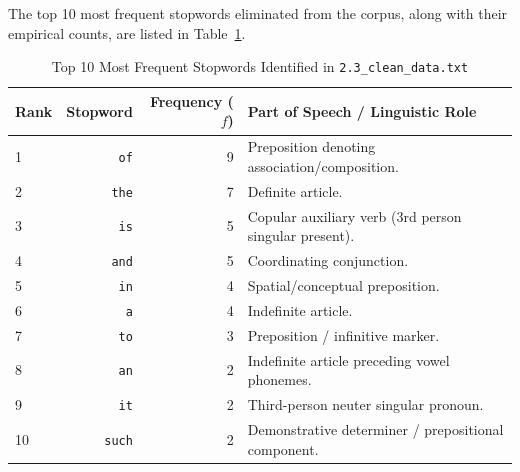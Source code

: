 \documentclass[12pt,a4paper]{report}
\begin{document}
The top 10 most frequent stopwords eliminated from the corpus, along with their empirical counts, are listed in Table~\ref{tab:exp2_top_stopwords}.
\begin{table}[H]
\centering
\small
\caption{Top 10 Most Frequent Stopwords Identified in \texttt{2.3\_clean\_data.txt}}
\label{tab:exp2_top_stopwords}
\begin{tabular}{lrrp{6.5cm}}
\toprule
\textbf{Rank} & \textbf{Stopword} & \textbf{Frequency ($f$)} & \textbf{Part of Speech / Linguistic Role} \\
\midrule
1 & \texttt{of} & 9 & Preposition denoting association/composition. \\
2 & \texttt{the} & 7 & Definite article. \\
3 & \texttt{is} & 5 & Copular auxiliary verb (3rd person singular present). \\
4 & \texttt{and} & 5 & Coordinating conjunction. \\
5 & \texttt{in} & 4 & Spatial/conceptual preposition. \\
6 & \texttt{a} & 4 & Indefinite article. \\
7 & \texttt{to} & 3 & Preposition / infinitive marker. \\
8 & \texttt{an} & 2 & Indefinite article preceding vowel phonemes. \\
9 & \texttt{it} & 2 & Third-person neuter singular pronoun. \\
10 & \texttt{such} & 2 & Demonstrative determiner / prepositional component. \\
\bottomrule
\end{tabular}
\end{table}
\end{document}

